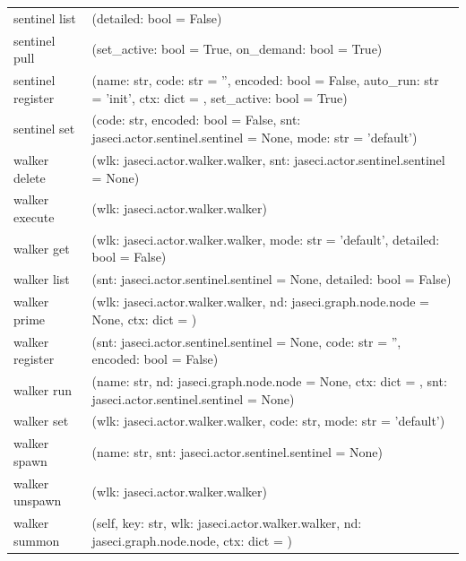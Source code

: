{\begin{longtable}{l p{10cm}}
        sentinel list                       & (detailed: bool = False)                                                                                              \\
        sentinel pull                       & (set\_active: bool = True, on\_demand: bool = True)                                                                   \\
        sentinel register                   & (name: str, code: str = '', encoded: bool = False, auto\_run: str = 'init', ctx: dict = {}, set\_active: bool = True) \\
        sentinel set                        & (code: str, encoded: bool = False, snt: jaseci.actor.sentinel.sentinel = None, mode: str = 'default')                 \\
        walker delete                       & (wlk: jaseci.actor.walker.walker, snt: jaseci.actor.sentinel.sentinel = None)                                         \\
        walker execute                      & (wlk: jaseci.actor.walker.walker)                                                                                     \\
        walker get                          & (wlk: jaseci.actor.walker.walker, mode: str = 'default', detailed: bool = False)                                      \\
        walker list                         & (snt: jaseci.actor.sentinel.sentinel = None, detailed: bool = False)                                                  \\
        walker prime                        & (wlk: jaseci.actor.walker.walker, nd: jaseci.graph.node.node = None, ctx: dict = {})                                  \\
        walker register                     & (snt: jaseci.actor.sentinel.sentinel = None, code: str = '', encoded: bool = False)                                   \\
        walker run                          & (name: str, nd: jaseci.graph.node.node = None, ctx: dict = {}, snt: jaseci.actor.sentinel.sentinel = None)            \\
        walker set                          & (wlk: jaseci.actor.walker.walker, code: str, mode: str = 'default')                                                   \\
        walker spawn                        & (name: str, snt: jaseci.actor.sentinel.sentinel = None)                                                               \\
        walker unspawn                      & (wlk: jaseci.actor.walker.walker)                                                                                     \\
        walker summon                       & (self, key: str, wlk: jaseci.actor.walker.walker, nd: jaseci.graph.node.node, ctx: dict = {})                         \\


\end{longtable}}
